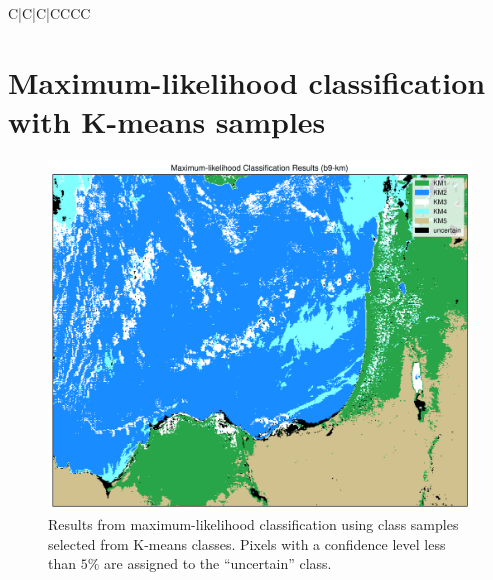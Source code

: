\documentclass[12pt]{article}
\begin{document}
\begin{table}[h!]
\begin{tabular}{C|C|C|CCCC}
\end{tabular}
    \caption{Emissive band mean brightness temperatures, standard deviations, and covariance matrices for each of the surface types sampled from K-means results. Notice that since ice cloud samples taken from the K-means results include fewer mid-level clouds over the coast of Israel, and more optically thick cirrus over water. This is why the $3.79\mu m$ band, which senses reflectance, has a high variance within the class. The $3.79\mu m$ band also has a negative covariance with respect to both water and ice clouds because more reflective clouds are generally colder.}
\label{samples_km_temp_stats}
\end{table}


\clearpage

\vspace{-1em}

\section{Maximum-likelihood classification with K-means samples}

\begin{figure}[h!]
    \centering

    \includegraphics[width=.85\textwidth]{figs/class/mlc_b9-km_6c.png}

    \caption{Results from maximum-likelihood classification using class samples selected from K-means classes. Pixels with a confidence level less than $5\%$ are assigned to the ``uncertain'' class.}
    \label{mlc_km_results}
\end{figure}

\vspace{-1.5em}
\end{document}
